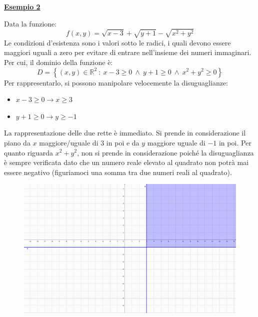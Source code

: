 \documentclass[a4paper]{article}
\newcommand{\example}[1]{\textcolor{Green4}{\textbf{#1}}}
\begin{document}
	\begin{flushleft}
		\example{\underline{Esempio 2}}
	\end{flushleft}

	\noindent
	Data la funzione:
	\begin{equation*}
		f\left(x,y\right) = \sqrt{x-3} + \sqrt{y+1} - \sqrt{x^{2} + y^{2}}
	\end{equation*}
	Le condizioni d'esistenza sono i valori sotto le radici, i quali devono essere maggiori uguali a zero per evitare di entrare nell'insieme dei numeri immaginari. Per cui, il dominio della funzione è:
	\begin{equation*}
		D = \left\{\left(x,y\right) \in \mathbb{R}^{2} \: : \: x-3 \ge 0 \: \land \: y+1 \ge 0 \: \land \: x^{2}+y^{2} \ge 0\right\}
	\end{equation*}
	Per rappresentarlo, si possono manipolare velocemente la disuguaglianze:
	\begin{itemize}
		\item $x-3 \ge 0 \rightarrow x \ge 3$

		\item $y+1 \ge 0 \rightarrow y \ge -1$
	\end{itemize}
	La rappresentazione delle due rette è immediato. Si prende in considerazione il piano da $x$ maggiore/uguale di $3$ in poi e da $y$ maggiore uguale di $-1$ in poi. Per quanto riguarda $x^{2} + y^{2}$, non si prende in considerazione poiché la disuguaglianza è sempre verificata dato che un numero reale elevato al quadrato non potrà mai essere negativo (figuriamoci una somma tra due numeri reali al quadrato).
	\begin{figure}[!htp]
		\centering
		\includegraphics[width=.6\textwidth]{img/dominio_di_funzioni-2.pdf}
	\end{figure}
\end{document}
